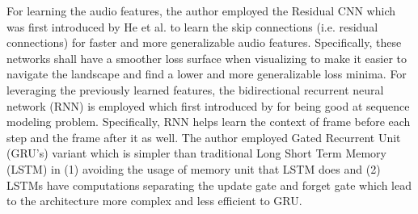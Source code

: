 For learning the audio features, the author employed the Residual CNN which was first introduced by He et al. \cite{resnet} to learn the skip connections (i.e. residual connections) for faster and more generalizable audio features. Specifically, these networks shall have a smoother loss surface when visualizing to make it easier to navigate the landscape and find a lower and more generalizable loss minima.  For leveraging the previously learned features, the bidirectional recurrent neural network (RNN) is employed which first introduced by for being good at sequence modeling problem. Specifically, RNN helps learn the context of frame before each step and the frame after it as well. The author employed Gated Recurrent Unit (GRU's) variant which is simpler than traditional Long Short Term Memory (LSTM) in (1) avoiding the usage of memory unit that LSTM does and (2)  LSTMs have computations  separating the update gate and forget gate which lead to the architecture more complex and less efficient to GRU. 


